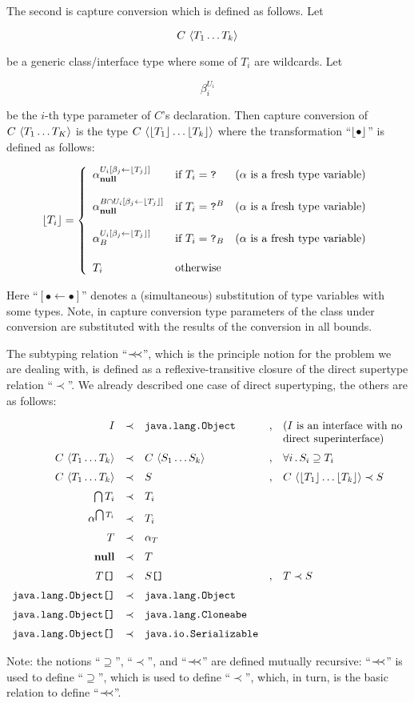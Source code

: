 The second is capture conversion which is defined as follows. Let

\[
{C}\,\left<{T_1\dots T_k}\right>
\]

be a generic class/interface type where some of $T_i$ are wildcards. Let

\[
\beta_i^{U_i}
\]

be the $i$-th type parameter of $C$'s declaration. Then capture conversion of
${C}\,\left<{T_1\dots T_K}\right>$ is the type ${C}\,\left<{\lfloor{T_1}\rfloor\dots \lfloor{T_k}\rfloor}\right>$ where the transformation
``$\lfloor{\bullet}\rfloor$'' is defined as follows:

\[
\lfloor{T_i}\rfloor=\left\{
\begin{array}{lll}  
  \alpha^{U_i[\beta_j\gets \lfloor{T_j}\rfloor]}_{\mathbf{null}}      &\mbox{if }        T_i=\texttt{?}  &\mbox{($\alpha$ is a fresh type variable)}\\[5mm]
  \alpha^{B\cap U_i[\beta_j\gets \lfloor{T_j}\rfloor]}_{\mathbf{null}} &\mbox{if }        T_i=\texttt{?}^B &\mbox{($\alpha$ is a fresh type variable)}\\[5mm]
  \alpha^{U_i[\beta_j\gets \lfloor{T_j}\rfloor]}_B               &\mbox{if }        T_i=\texttt{?}_B &\mbox{($\alpha$ is a fresh type variable)}\\[5mm]
  T_i                                           &\mbox{otherwise}  & 
\end{array}\right.
\]

Here ``$[\bullet\gets\bullet]$'' denotes a (simultaneous) substitution of type variables with some types. Note, in capture conversion
type parameters of the class under conversion are substituted with the results of the conversion in all bounds.

The subtyping relation ``$\prec\mathrel{\mkern-5mu}\prec$'', which is the principle notion for the problem we are dealing with, is defined as a reflexive-transitive
closure of the direct supertype relation ``$\prec$''. We already described one case of direct supertyping, the others are as follows:

\[
\begin{array}{rclcl}
  I & \prec & \texttt{java.lang.Object} &,& \mbox{($I$ is an interface with no}\\
    &       &                         & &\mbox{direct superinterface)}\\[2mm]
  {C}\,\left<{T_1\dots T_k}\right> & \prec & {C}\,\left<{S_1\dots S_k}\right> &,& \forall i\, .\, S_i\supseteq T_i\\[2mm]
  {C}\,\left<{T_1\dots T_k}\right> & \prec & S &,& {C}\,\left<{\lfloor{T_1}\rfloor\dots \lfloor{T_k}\rfloor}\right>\prec S\\[2mm]
  \bigcap T_i & \prec & T_i && \\[2mm]
  \alpha^{\bigcap T_i} & \prec & T_i &&\\[2mm]
  T & \prec & \alpha_T && \\[2mm]
  \mathbf{null} & \prec & T &&\\[2mm]
  T\texttt{[]} & \prec & S\texttt{[]} &,& T\prec S\\[2mm]
  \texttt{java.lang.Object[]} & \prec & \texttt{java.lang.Object} &&  \\[2mm]
  \texttt{java.lang.Object[]} & \prec & \texttt{java.lang.Cloneabe} && \\[2mm]
  \texttt{java.lang.Object[]} & \prec & \texttt{java.io.Serializable} &&
\end{array}
\]

Note: the notions ``$\supseteq$'', ``$\prec$'', and ``$\prec\mathrel{\mkern-5mu}\prec$'' are defined mutually recursive: ``$\prec\mathrel{\mkern-5mu}\prec$'' is used
to define ``$\supseteq$'', which is used to define ``$\prec$'', which, in turn, is the basic relation to define ``$\prec\mathrel{\mkern-5mu}\prec$''.
